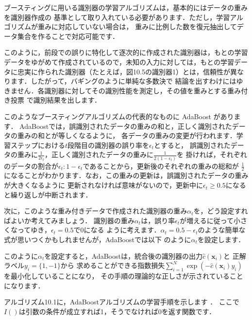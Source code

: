 
ブースティングに用いる識別器の学習アルゴリズムは，基本的にはデータの重みを識別器作成の
基準として取り入れている必要があります．ただし，学習アルゴリズムが重みに対応していない場合は，
重みに比例した数を復元抽出してデータ集合を作ることで対応可能です．

このように，前段での誤りに特化して逐次的に作成された識別器は，もとの学習データをゆがめて作成されているので，未知の入力に対しては，もとの学習データに忠実に作られた識別器（たとえば，図10.5の識別器1）とは，信頼性が異なります．したがって，バギングのように単純な多数決で
結論を出すわけにはゆきません．各識別器に対してその識別性能を測定し，その値を重みとする重み付き投票
で識別結果を出します．


このようなブースティングアルゴリズムの代表的なものに
AdaBoost
があります．
AdaBoostでは，誤識別されたデータの重みの和と，正しく識別されたデータの重みの和とが等しくなるように，
各データの重みの変更が行われます．学習ステップにおける$t$段階目の識別器の誤り率を$\epsilon_t$とすると，
誤識別されたデータの重みに$\frac{1}{2\epsilon_t}$，正しく識別されたデータの重みに$\frac{1}{2(1-\epsilon_t)}$を
掛ければ，それぞれのデータの割合が$\epsilon_t:1-\epsilon_t$であることから，更新後のそれぞれの重みの総和が
$\frac{1}{2}$になることがわかります．なお，この重みの更新は，誤識別されたデータの重みが大きくなるように
更新されなければ意味がないので，更新中に$\epsilon_t \ge 0.5$になると繰り返しが中断されます．


次に，このような重み付きデータで作成された識別器の重み$\alpha_t$を，どう設定すればよいか考えてみましょう．
識別器の重み$\alpha_t$は，誤り率$\epsilon_t$が増えるに従って小さくなってゆき，$\epsilon_t=0.5$で$0$になる
ように考えます．$\alpha_t = 0.5-\epsilon_t$のような簡単な式が思いつくかもしれませんが，AdaBoostでは以下
のように$\alpha_t$を設定します．


このように$\alpha_t$を設定すると，AdaBoostは，統合後の識別器の出力$\hat{c}(\bm{x}_i)$と
正解ラベル$y_i=\{1,-1\}$から
求めることができる指数損失$\sum_{i=1}^{N}\exp(-\hat{c}(\bm{x}_i) y_i)$を最小化していることになり，
その手順の理論的な正しさが示されていることになります．

アルゴリズム10.1に，AdaBoostアルゴリズムの学習手順を示します
．
ここで$I( )$は引数の条件が成立すれば1，そうでなければ0を返す関数です．



